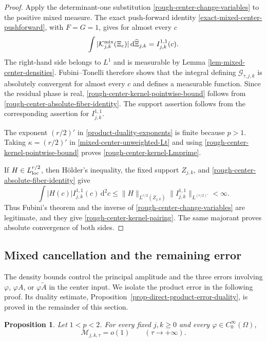 \documentclass[a4paper,11pt]{article}
\newcommand{\dd}{\,\text{d}}
\theoremstyle{plain}
\newtheorem{prop}[thm]{Proposition}
\theoremstyle{definition}
\theoremstyle{remark}
\begin{document}
\begin{proof}
Apply the determinant-one substitution
\eqref{rough-center-change-variables} to the positive mixed measure.  The
exact push-forward identity \eqref{exact-mixed-center-pushforward}, with
$F=G=1$, gives for almost every $c$
\begin{equation}\label{rough-center-absolute-fiber-identity}
 \int
   |\mathcal K_{j,k}^{\rm mix}(\Xi_c)|
   \dd\widehat\Xi_{j,k}
 =I_{j,k}^{1,1}(c).
\end{equation}
The right-hand side belongs to $L^1$ and is measurable by Lemma
\ref{lem-mixed-center-densities}.  Fubini--Tonelli therefore shows that the
integral defining $\mathcal G_{\tau,j,k}$ is absolutely convergent for almost every
$c$ and defines a measurable function.  Since the residual phase is real,
\eqref{rough-center-kernel-pointwise-bound} follows from
\eqref{rough-center-absolute-fiber-identity}.  The support assertion follows
from the corresponding assertion for $I_{j,k}^{1,1}$.

The exponent $(r/2)'$ in \eqref{product-duality-exponents} is finite because
$p>1$.  Taking $\kappa=(r/2)'$ in \eqref{mixed-center-unweighted-Lt} and using
\eqref{rough-center-kernel-pointwise-bound} proves
\eqref{rough-center-kernel-Lmprime}.

If $H\in L^{r/2}_{\rm loc}$, then H\"older's inequality,
the fixed support $Z_{j,k}$, and
\eqref{rough-center-absolute-fiber-identity} give
\[
 \int |H(c)|I_{j,k}^{1,1}(c)\dd^2c
 \leq \|H\|_{L^{r/2}(Z_{j,k})}
       \|I_{j,k}^{1,1}\|_{L^{(r/2)'}}<\infty.
\]
Thus Fubini's theorem and the inverse of
\eqref{rough-center-change-variables} are legitimate, and they give
\eqref{rough-center-kernel-pairing}.  The same majorant proves absolute
convergence of both sides.
\end{proof}

\subsection{Mixed cancellation and the remaining error}\label{subsec-mixed-reduction}

The density bounds control the principal amplitude and the three errors involving $\varphi$, $\varphi A$, or $\varphi\widetilde A$ in the center input. We isolate the product error in the following proof. Its duality estimate, Proposition~\ref{prop-direct-product-error-duality}, is proved in the remainder of this section.

\begin{prop}\label{prop-fixed-mixed-cancellations}
Let $1<p<2$.  For every fixed $j,k\geq0$ and every $\varphi\in C_0^\infty(\Omega)$,
\begin{equation}\label{fixed-mixed-cancellation}
        \mathcal M_{j,k,\tau}=o(1)
        \qquad (\tau\to+\infty).
\end{equation}
\end{prop}
\end{document}
